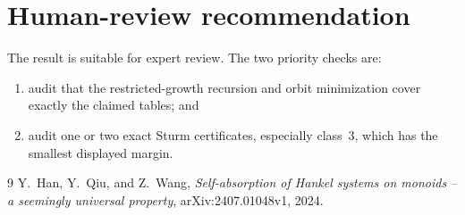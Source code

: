 \documentclass[11pt]{article}
\begin{document}
\section{Human-review recommendation}

The result is suitable for expert review.  The two priority checks are:
\begin{enumerate}
\item audit that the restricted-growth recursion and orbit minimization cover
exactly the claimed tables; and
\item audit one or two exact Sturm certificates, especially class~3, which has
the smallest displayed margin.
\end{enumerate}

\begin{thebibliography}{9}
Y.~Han, Y.~Qiu, and Z.~Wang,
\emph{Self-absorption of Hankel systems on monoids -- a seemingly universal
property}, arXiv:2407.01048v1, 2024.
\end{thebibliography}
\end{document}
